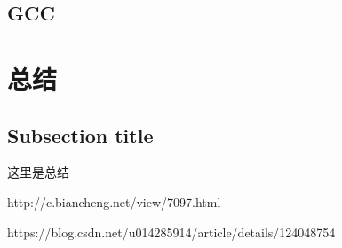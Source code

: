 \documentclass{article}
\begin{document}
\begin{CJK}{UTF8}{gkai}
\subsection{GCC}


\section{总结}
\subsection{Subsection title}
        这里是总结



\begin{thebibliography}{12345}%
 http://c.biancheng.net/view/7097.html

 https://blog.csdn.net/u014285914/article/details/124048754 

\end{thebibliography}
\end{CJK}
\end{document}
